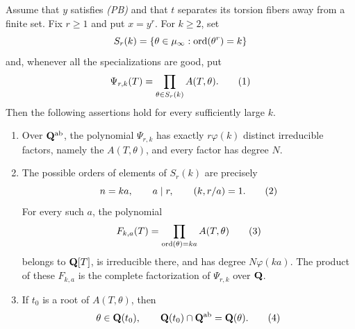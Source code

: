 \begin{theorem}
\label{thm:kummer-torsion}
Assume that $y$ satisfies \emph{(PB)} and that $t$ separates its torsion
fibers away from a finite set.  Fix $r\ge1$ and put $x=y^r$.  For
$k\ge2$, set
\[
 S_r(k)=\{\theta\in\mu_\infty:\operatorname{ord}(\theta^r)=k\}
\]
and, whenever all the specializations are good, put
\[
 \Psi_{r,k}(T)=\prod_{\theta\in S_r(k)}A(T,\theta).
 \numberthis\label{eq:abstract-Psi}
\]
Then the following assertions hold for every sufficiently large $k$.

\begin{enumerate}[label=\textup{(\roman*)}]
\item Over $\mathbf Q^{\mathrm{ab}}$, the polynomial $\Psi_{r,k}$ has exactly
      $r\varphi(k)$ distinct irreducible factors, namely the
      $A(T,\theta)$, and every factor has degree $N$.
\item The possible orders of elements of $S_r(k)$ are precisely
      \[
       n=ka,\qquad a\mid r,\qquad (k,r/a)=1.
       \numberthis\label{eq:admissible-orders}
      \]
      For every such $a$, the polynomial
      \[
       F_{k,a}(T)=
       \prod_{\ord(\theta)=ka}A(T,\theta)
       \numberthis\label{eq:order-block}
      \]
      belongs to $\mathbf Q[T]$, is irreducible there, and has degree
      $N\varphi(ka)$.  The product of these $F_{k,a}$ is the complete
      factorization of $\Psi_{r,k}$ over $\mathbf Q$.
\item If $t_0$ is a root of $A(T,\theta)$, then
      \[
       \theta\in\Q(t_0),\qquad
       \Q(t_0)\cap\Q^{\mathrm{ab}}=\Q(\theta).
       \numberthis\label{eq:abstract-intersection}
      \]
\end{enumerate}
\end{theorem}

